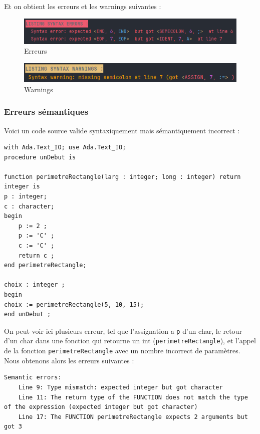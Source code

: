\documentclass[french,a4paper]{article}
\begin{document}
    Et on obtient les erreurs et les warnings suivantes :

    \begin{figure}[H]
        \centering
        \includegraphics[width=1\textwidth]{syntax_err}
        \caption{Erreurs}\label{fig:figure8}
    \end{figure}

    \begin{figure}[H]
        \centering
        \includegraphics[width=1\textwidth]{syntax_warn}
        \caption{Warnings}\label{fig:figure9}
    \end{figure}
    \subsubsection{Erreurs sémantiques}

    Voici un code source valide syntaxiquement mais sémantiquement incorrect :

    \begin{lstlisting}[label={lst:lstlisting18}]
with Ada.Text_IO; use Ada.Text_IO;
procedure unDebut is

function perimetreRectangle(larg : integer; long : integer) return integer is
p : integer;
c : character;
begin
    p := 2 ;
    p := 'C' ;
    c := 'C' ;
    return c ;
end perimetreRectangle;

choix : integer ;
begin
choix := perimetreRectangle(5, 10, 15);
end unDebut ;
    \end{lstlisting}

    On peut voir ici plusieurs erreur, tel que l'assignation a \texttt{p} d'un char, le retour d'un char dans une fonction qui retourne un int (\texttt{perimetreRectangle}), et l'appel de la fonction \texttt{perimetreRectangle} avec un nombre incorrect de paramètres. \\
    Nous obtenons alors les erreurs suivantes :
    \begin{lstlisting}
Semantic errors:
	Line 9: Type mismatch: expected integer but got character
	Line 11: The return type of the FUNCTION does not match the type of the expression (expected integer but got character)
	Line 17: The FUNCTION perimetreRectangle expects 2 arguments but got 3
    \end{lstlisting}
\end{document}
